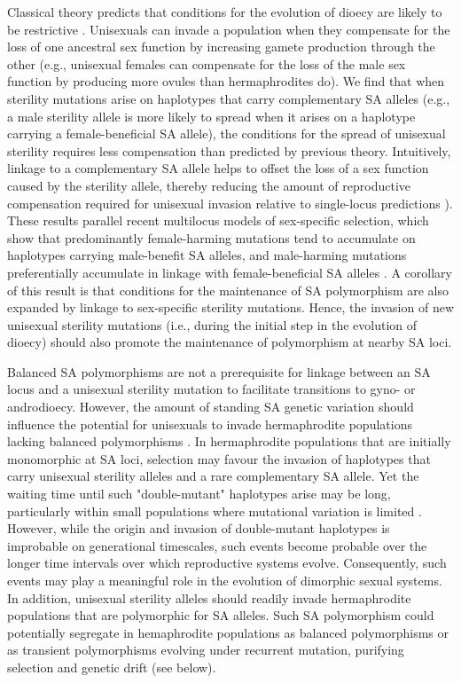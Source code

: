 \documentclass{article}
\newcommand\hl[1]{%
  \bgroup
  \hskip0pt\color{blue!80!black}%
  #1%
  \egroup
}
\begin{document}
Classical theory predicts that conditions for the evolution of dioecy are likely to be restrictive \citep{Lloyd1975,Lloyd1976,Charlesworth1978a,KaferPannell2017}. Unisexuals can invade a population when they compensate for the loss of one ancestral sex function by increasing gamete production through the other (e.g., unisexual females can compensate for the loss of the male sex function by producing more ovules than hermaphrodites do). We find that when sterility mutations arise on haplotypes that carry complementary SA alleles (e.g., a male sterility allele is more likely to spread when it arises on a haplotype carrying a female-beneficial SA allele), the conditions for the spread of unisexual sterility requires less compensation than predicted by previous theory. \hl{Intuitively, linkage to a complementary SA allele helps to offset the loss of a sex function caused by the sterility allele, thereby} reducing the amount of reproductive compensation required for unisexual invasion relative to single-locus predictions \citealt{Charlesworth1978a}). These results parallel recent multilocus models of sex-specific selection, which show that predominantly female-harming mutations tend to accumulate on haplotypes carrying male-benefit SA alleles, and male-harming mutations preferentially accumulate in linkage with female-beneficial SA alleles \citep{ConnallonJordan2016, Patten2010, UbedaPatten2010, BlackburnOtto2010}. A corollary of this result is that conditions for the maintenance of SA polymorphism are also expanded by linkage to sex-specific sterility mutations. Hence, the invasion of new unisexual sterility mutations (i.e., during the initial step in the evolution of dioecy) should also promote the maintenance of polymorphism at nearby SA loci. 

\hl{Balanced SA polymorphisms are not a prerequisite for linkage between an SA locus and a unisexual sterility mutation to facilitate transitions to gyno- or androdioecy. However,} the amount of standing SA genetic variation should influence the potential for unisexuals to invade hermaphrodite populations \hl{lacking balanced polymorphisms}. In hermaphrodite populations that are initially monomorphic at SA loci, selection may favour the invasion of haplotypes that carry unisexual sterility alleles and a rare complementary SA allele. Yet the waiting time until such "double-mutant" haplotypes arise may be long, particularly within small populations where mutational variation is limited \citep{WeinreichChao2005,ConnallonClark2010}. \hl{However, while the origin and invasion of double-mutant haplotypes is improbable on generational timescales, such events become probable over the longer time intervals over which reproductive systems evolve. Consequently, such events may play a meaningful role in the evolution of dimorphic sexual systems. In addition, unisexual sterility alleles should readily invade hermaphrodite populations that are polymorphic for SA alleles. Such SA polymorphism could potentially segregate in hemaphrodite populations as balanced polymorphisms or as transient polymorphisms evolving under recurrent mutation, purifying selection and genetic drift (see below).}
\end{document}
